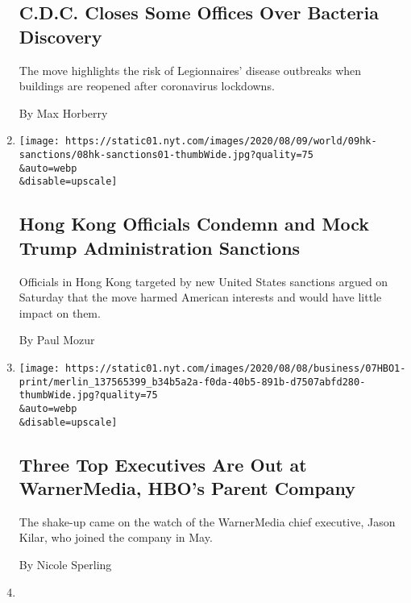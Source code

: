 \begin{enumerate}
  \hypertarget{cdc-closes-some-offices-over-bacteria-discovery}{%
  \subsection{C.D.C. Closes Some Offices Over Bacteria
  Discovery}\label{cdc-closes-some-offices-over-bacteria-discovery}}

  The move highlights the risk of Legionnaires' disease outbreaks when
  buildings are reopened after coronavirus lockdowns.

  By Max Horberry
\item
  \href{/2020/08/08/world/asia/hong-kong-sanctions-united-states.html}{}

  \texttt{[image: https://static01.nyt.com/images/2020/08/09/world/09hk-sanctions/08hk-sanctions01-thumbWide.jpg?quality=75\\\&auto=webp\\\&disable=upscale]}

  \hypertarget{hong-kong-officials-condemn-and-mock-trump-administration-sanctions}{%
  \subsection{Hong Kong Officials Condemn and Mock Trump Administration
  Sanctions}\label{hong-kong-officials-condemn-and-mock-trump-administration-sanctions}}

  Officials in Hong Kong targeted by new United States sanctions argued
  on Saturday that the move harmed American interests and would have
  little impact on them.

  By Paul Mozur
\item
  \href{/2020/08/07/business/media/hbo-warnermedia-executive-departure.html}{}

  \texttt{[image: https://static01.nyt.com/images/2020/08/08/business/07HBO1-print/merlin\_137565399\_b34b5a2a-f0da-40b5-891b-d7507abfd280-thumbWide.jpg?quality=75\\\&auto=webp\\\&disable=upscale]}

  \hypertarget{three-top-executives-are-out-at-warnermedia-hbos-parent-company}{%
  \subsection{Three Top Executives Are Out at WarnerMedia, HBO's Parent
  Company}\label{three-top-executives-are-out-at-warnermedia-hbos-parent-company}}

  The shake-up came on the watch of the WarnerMedia chief executive,
  Jason Kilar, who joined the company in May.

  By Nicole Sperling
\item
  \href{/2020/08/07/health/coronavirus-exams-mcat.html}{}


\end{enumerate}
